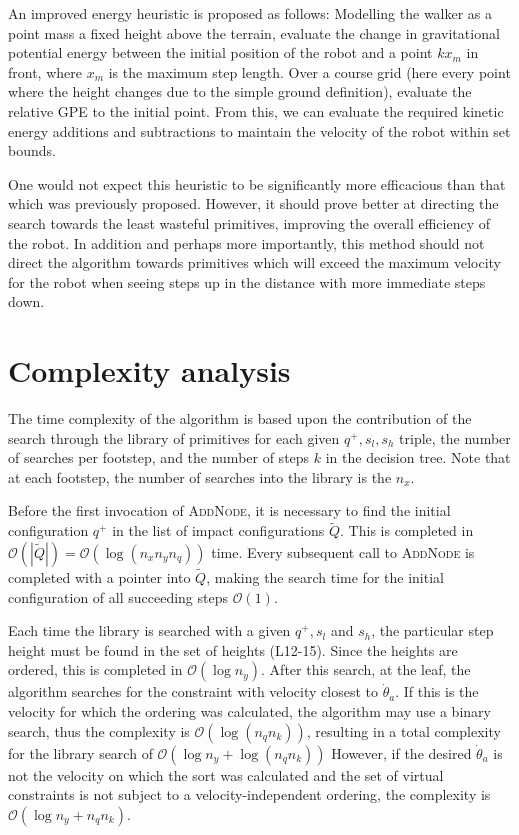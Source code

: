 An improved energy heuristic is proposed as follows: Modelling the walker as a point mass a fixed height above the terrain, evaluate the change in gravitational potential energy between the initial position of the robot and a point $kx_m$ in front, where $x_m$ is the maximum step length. Over a course grid (here every point where the height changes due to the simple ground definition), evaluate the relative GPE to the initial point. From this, we can evaluate the required kinetic energy additions and subtractions to maintain the velocity of the robot within set bounds.
	
One would not expect this heuristic to be significantly more efficacious than that which was previously proposed. However, it should prove better at directing the search towards the least wasteful primitives, improving the overall efficiency of the robot. In addition and perhaps more importantly, this method should not direct the algorithm towards primitives which will exceed the maximum velocity for the robot when seeing steps up in the distance with more immediate steps down.

\section{Complexity analysis} \label{sec:complexity}
The time complexity of the algorithm is based upon the contribution of the search through the library of primitives for each given $q^+,s_l,s_h$ triple, the number of searches per footstep, and the number of steps $k$ in the decision tree. Note that at each footstep, the number of searches into the library is the $n_x$.

Before the first invocation of \textsc{AddNode}, it is necessary to find the initial configuration $q^+$ in the list of impact configurations $\tilde{Q}$. This is completed in $\mathcal{O}(|\tilde{Q}|)=\mathcal{O}(\log(n_xn_yn_q))$ time. Every subsequent call to \textsc{AddNode} is completed with a pointer into $\tilde{Q}$, making the search time for the initial configuration of all succeeding steps $\mathcal{O}(1)$.

Each time the library is searched with a given $q^+,s_l$ and $s_h$, the particular step height must be found in the set of heights (L12-15). Since the heights are ordered, this is completed in $\mathcal{O}(\log n_y)$. After this search, at the leaf, the algorithm searches for the constraint with velocity closest to $\dot{\theta}_a$. If this is the velocity for which the ordering was calculated, the algorithm may use a binary search, thus the complexity is $\mathcal{O}(\log(n_qn_k))$, resulting in a total complexity for the library search of $\mathcal{O}(\log n_y+\log(n_qn_k))$ However, if the desired $\dot{\theta}_a$ is not the velocity on which the sort was calculated and the set of virtual constraints is not subject to a velocity-independent ordering, the complexity is $\mathcal{O}(\log n_y +n_qn_k)$.

